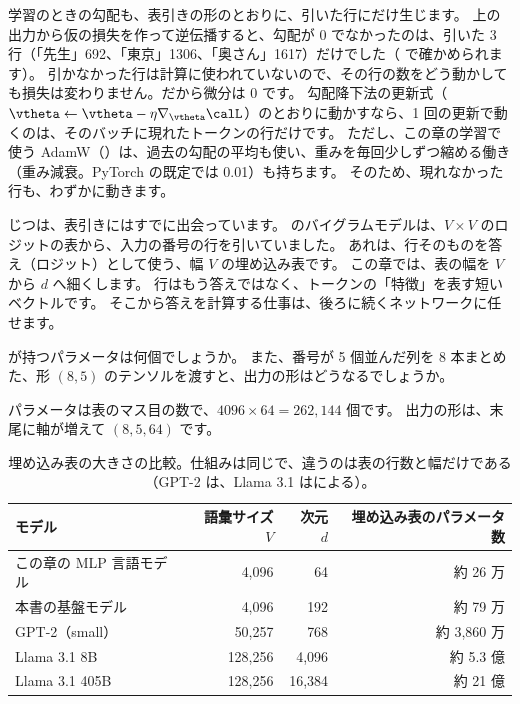 学習のときの勾配も、表引きの形のとおりに、引いた行にだけ生じます。
上の出力から仮の損失を作って逆伝播すると、勾配が 0 でなかったのは、引いた 3 行（「先生」692、「東京」1306、「奥さん」1617）だけでした（ で確かめられます）。
引かなかった行は計算に使われていないので、その行の数をどう動かしても損失は変わりません。だから微分は 0 です。
勾配降下法の更新式（$\vtheta\leftarrow\vtheta-\eta\nabla_{\vtheta}\calL$）のとおりに動かすなら、1 回の更新で動くのは、そのバッチに現れたトークンの行だけです。
ただし、この章の学習で使う AdamW（）は、過去の勾配の平均も使い、重みを毎回少しずつ縮める働き（重み減衰。PyTorch の既定では 0.01）も持ちます。
そのため、現れなかった行も、わずかに動きます。

じつは、表引きにはすでに出会っています。
のバイグラムモデルは、$V\times V$ のロジットの表から、入力の番号の行を引いていました。
あれは、行そのものを答え（ロジット）として使う、幅 $V$ の埋め込み表です。
この章では、表の幅を $V$ から $d$ へ細くします。
行はもう答えではなく、トークンの「特徴」を表す短いベクトルです。
そこから答えを計算する仕事は、後ろに続くネットワークに任せます。

\begin{quiz}
 が持つパラメータは何個でしょうか。
また、番号が 5 個並んだ列を 8 本まとめた、形 $(8,5)$ のテンソルを渡すと、出力の形はどうなるでしょうか。
\end{quiz}

パラメータは表のマス目の数で、$4096\times 64=262{,}144$ 個です。
出力の形は、末尾に軸が増えて $(8,5,64)$ です。

\begin{table}[tbp]
\centering
\caption{埋め込み表の大きさの比較。仕組みは同じで、違うのは表の行数と幅だけである（GPT-2 は\cite{radford2019language}、Llama 3.1 は\cite{dubey2024llama3}による）。}
\label{tab:emb-scale}
\small
\begin{tabular}{lrrr}
\toprule
モデル & 語彙サイズ $V$ & 次元 $d$ & 埋め込み表のパラメータ数 \\
\midrule
この章の MLP 言語モデル & 4,096 & 64 & 約 26 万 \\
本書の基盤モデル & 4,096 & 192 & 約 79 万 \\
GPT-2（small） & 50,257 & 768 & 約 3,860 万 \\
Llama 3.1 8B & 128,256 & 4,096 & 約 5.3 億 \\
Llama 3.1 405B & 128,256 & 16,384 & 約 21 億 \\
\bottomrule
\end{tabular}
\end{table}

